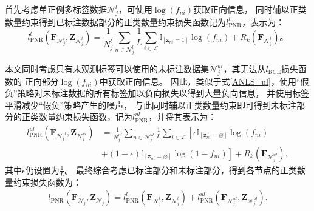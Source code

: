 {首先考虑单正例多标签数据$\mathcal{N}_j^l$，可使用$\log\left(f_{ni}\right)$获取正向信息，
同时辅以正类数量约束得到已标注数据部分的正类数量约束损失函数记为$l_{\mathrm{PNR}}^l$，表示为：}
\begin{equation}
    \label{PNR_l}
    l_{\mathrm{PNR}}^l\left(\boldsymbol{F}_{\mathcal{N}_j^l}, \boldsymbol{Z}_{\mathcal{N}_j^l}\right)
    =\frac{1}{N_j^l} \sum_{n\in\mathcal{N}_j^{l}} \frac{1}{L} \sum_{i\in\mathcal{L}} 
    \mathbb{I}_{\left[\boldsymbol z_{n i}=1\right]}\log\left(f_{ni}\right)
    +R_k\left(\boldsymbol F_{\mathcal{N}_j^l}\right)。
\end{equation}

本文同时考虑只有未观测标签可以使用的未标注数据集$\mathcal{N}_j^{ul}$，其无法从$l_{\mathrm{BCE}}$损失函数的
正向部分$\log\left(f_{ni}\right)$中获取正向信息。
因此，类似于式\eqref{ANLS_ul}，使用“假负”策略对未标注数据的所有标签加以负向损失以得到大量负向信息，
并使用标签平滑减少“假负”策略产生的噪声，
与此同时辅以正类数量约束即可得到未标注部分的正类数量约束损失函数，记为$l_{\mathrm{PNR}}^{ul}$，并将其表示为：
\begin{equation}
    \label{PNR_ul}
    \begin{split}
        l_{\mathrm{PNR}}^{ul}\left(\boldsymbol{F}_{\mathcal{N}_j^{ul}}, \boldsymbol{Z}_{\mathcal{N}_j^{ul}}\right)
        &=\frac{1}{N_j^{ul}} \sum_{n\in\mathcal{N}_j^{{ul}}} \frac{1}{L} \sum_{i\in\mathcal{L}} 
        \left[\epsilon \mathbb{I}_{\left[\boldsymbol z_{n i}=\varnothing\right]} \log \left(f_{n i}\right)  \right.\\
        &\left. + \left(1-\epsilon\right)\mathbb{I}_{\left[\boldsymbol z_{n i} = \varnothing \right]} \log \left(1-f_{n i}\right)\right] 
        +R_k\left(\boldsymbol F_{\mathcal{N}_j^{ul}}\right),
    \end{split}
\end{equation}
其中$\epsilon$仍设置为$\frac{1}{L}$。
最终综合考虑已标注部分和未标注部分，得到各节点的正类数量约束损失函数为：
\begin{equation}
    \label{PNR}
    \begin{split}
        l_{\mathrm{PNR}}\left(\boldsymbol{F}_{\mathcal{N}_j}, \boldsymbol{Z}_{\mathcal{N}_j}\right)
        =l_{\mathrm{PNR}}^l\left(\boldsymbol{F}_{\mathcal{N}_j^l}, \boldsymbol{Z}_{\mathcal{N}_j^l}\right)
        +l_{\mathrm{PNR}}^{ul}\left(\boldsymbol{F}_{\mathcal{N}_j^{ul}}, \boldsymbol{Z}_{\mathcal{N}_j^{ul}}\right).
    \end{split}
\end{equation}


